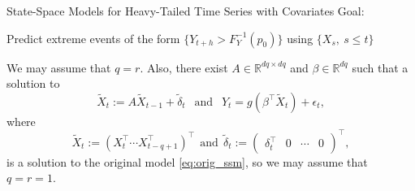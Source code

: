 \documentclass{beamer}
\def\R{\mathbb R}
\begin{document}
\begin{frame}{State-Space Models for Heavy-Tailed Time Series with Covariates}
    Goal:
    \begin{center}
        Predict extreme events of the form $\{Y_{t + h} > F_Y^{-1}(p_0)\}$ using $\{X_s, \ s \le t\}$    
    \end{center}

    \medskip
    
    We may assume that $q = r$. Also, there exist $A \in \R^{dq \times dq}$ and $\beta \in \R^{dq}$ such that a solution to
    \begin{equation}\label{eq:new_ssm}
    \tilde X_t := A \tilde X_{t-1} + \tilde \delta_t\ \ \mbox{ and }\ \ Y_t = g(\beta^{\top}\tilde X_t) + \epsilon_t,
    \end{equation}
    where
    \[
    \tilde{X}_t := (X_t^{\top} \cdots X_{t - q + 1}^{\top})^{\top} \ \ \text{and} \ \
    \tilde{\delta}_t := (\begin{matrix} \delta_t^{\top} & 0 & \cdots & 0 \end{matrix})^{\top},
    \]
    is a solution to the original model \eqref{eq:orig_ssm}, so we may assume that $q = r = 1$.
\end{frame}

\end{document}
